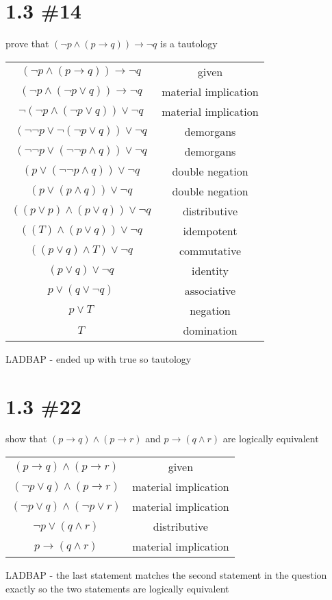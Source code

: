 \documentclass[h]{article}
\begin{document}
\section*{1.3 \#14}
prove that $(\neg p \wedge (p \rightarrow q)) \rightarrow \neg q$ is a tautology \newline
\begin{tabular}{|c c|}\hline
$(\neg p \wedge (p \rightarrow q)) \rightarrow \neg q$ & given \\
$(\neg p \wedge (\neg p \vee q)) \rightarrow \neg q$ & material implication \\
$\neg (\neg p \wedge (\neg p \vee q)) \vee \neg q$ & material implication \\
$ (\neg \neg p \vee \neg (\neg p \vee q)) \vee \neg q$ & demorgans \\
$ (\neg \neg p \vee  (\neg \neg p \wedge q)) \vee \neg q$ & demorgans \\
$ ( p \vee  (\neg \neg p \wedge q)) \vee \neg q$ & double negation \\
$ ( p \vee  (p \wedge q)) \vee \neg q$ & double negation \\
$ ( (p \vee p) \wedge (p \vee q)) \vee \neg q$ & distributive \\
$ ( (T) \wedge (p \vee q)) \vee \neg q$ & idempotent \\
$ ( (p \vee q) \wedge T) \vee \neg q$ & commutative \\
$ ( p \vee q) \vee \neg q$ & identity \\
$  p \vee (q \vee \neg q)$ & associative \\
$  p \vee T$ & negation \\
$  T $ & domination \\ \hline
\end{tabular}
\newline
LADBAP - ended up with true so tautology

\section*{1.3 \#22}
show that $(p \rightarrow q) \wedge (p \rightarrow r)$ and $p \rightarrow (q \wedge r)$ are logically equivalent \newline
\begin{tabular}{|c c|}\hline
$(p \rightarrow q) \wedge (p \rightarrow r)$ & given\\
$(\neg p \vee q) \wedge (p \rightarrow r)$ & material implication\\
$(\neg p \vee q) \wedge (\neg p \vee r)$ & material implication\\
$\neg p \vee (q \wedge r)$ & distributive\\
$p \rightarrow (q \wedge r)$ & material implication\\ \hline
\end{tabular}
\newline
LADBAP - the last statement matches the second statement in the question exactly so the two statements are logically equivalent
\end{document}
